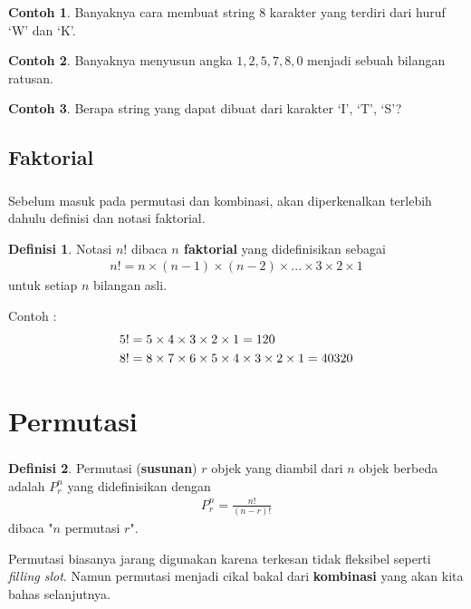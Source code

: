 \documentclass[aspectratio=169]{beamer}
\theoremstyle{definition}
\newtheorem{definisi}{Definisi}
\newtheorem{contoh}{Contoh}
\begin{document}
\begin{frame}
\frametitle{\insertsection}
\framesubtitle{\insertsubsection}
  \begin{contoh}
    Banyaknya cara membuat string 8 karakter yang terdiri dari huruf `W' dan `K'. 
  \end{contoh}
  \begin{contoh}
    Banyaknya menyusun angka $1,2,5,7,8,0$ menjadi sebuah bilangan ratusan. 
  \end{contoh}
  \begin{contoh}
    Berapa string yang dapat dibuat dari karakter `I', `T', `S'? 
  \end{contoh}
\end{frame}

\subsection{Faktorial}
\begin{frame}
\frametitle{\insertsection}
\framesubtitle{\insertsubsection}
Sebelum masuk pada permutasi dan kombinasi, akan diperkenalkan terlebih dahulu definisi dan notasi faktorial. 
\begin{definisi}
  Notasi $n!$ dibaca \textbf{$n$ faktorial} yang didefinisikan sebagai
    \begin{align}
        n!=n \times (n-1) \times (n-2) \times ... \times 3 \times 2 \times 1
    \end{align}
    untuk setiap $n$ bilangan asli.
\end{definisi}

Contoh :
    \begin{align*}
        5! &=5 \times 4 \times 3 \times 2 \times 1 = 120 \notag \\
        8! &= 8 \times 7 \times 6 \times 5 \times 4 \times 3 \times 2 \times 1 = 40320
    \end{align*}
\end{frame}

\section{Permutasi}
\begin{frame}
\frametitle{\insertsection}
\begin{definisi}
    Permutasi (\textbf{susunan}) $r$ objek yang diambil dari $n$ objek berbeda adalah $P_r^n$ yang didefinisikan dengan
    \begin{align}
        P_r^n = \frac{n!}{(n-r)!}
    \end{align}
    dibaca "$n$ permutasi $r$".
\end{definisi}
Permutasi biasanya jarang digunakan karena terkesan tidak fleksibel seperti \textit{filling slot}. Namun permutasi menjadi cikal bakal dari \textbf{kombinasi} yang akan kita bahas selanjutnya.
\end{frame}
\end{document}
